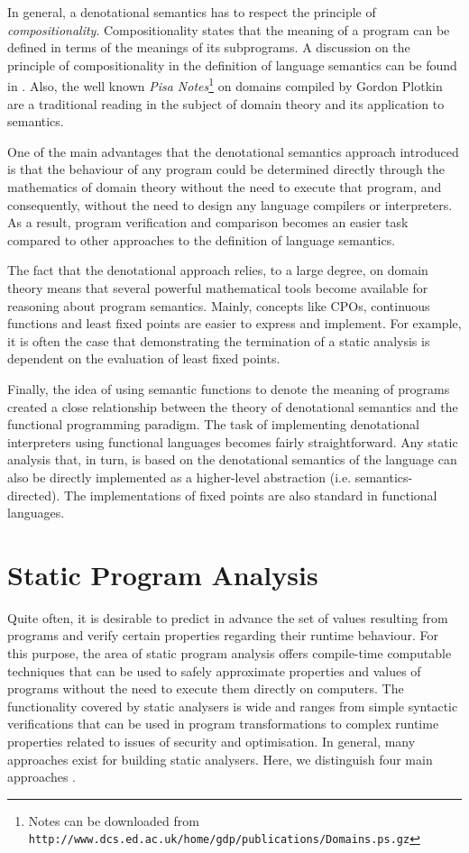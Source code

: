 \documentclass[10pt,a4paper,final,oneside,fleqn]{book}
\begin{document}
In general, a denotational semantics has to respect the principle of {\itshape compositionality\/}.  Compositionality states that the meaning of a program can be defined in terms of the meanings of its subprograms.  A discussion on the principle of compositionality in the definition of language semantics can be found in \cite{tennent1}.  Also, the well known {\itshape Pisa Notes\/}\footnote{Notes can be downloaded from \texttt{http://www.dcs.ed.ac.uk/home/gdp/publications/Domains.ps.gz}} on domains compiled by Gordon Plotkin are a traditional reading in the subject of domain theory and its application to semantics.

One of the main advantages that the denotational semantics approach introduced is that the behaviour of any program could be determined directly through the mathematics of domain theory without the need to execute that program, and consequently, without the need to design any language compilers or interpreters.  As a result, program verification and comparison becomes an easier task compared to other approaches to the definition of language semantics.

The fact that the denotational approach relies, to a large degree, on domain theory means that several powerful mathematical tools become available for reasoning about program semantics.  Mainly, concepts like CPOs, continuous functions and least fixed points are easier to express and implement.  For example, it is often the case that demonstrating the termination of a static analysis is dependent on the evaluation of least fixed points.

Finally, the idea of using semantic functions to denote the meaning of programs created a close relationship between the theory of denotational semantics and the functional programming paradigm.  The task of implementing denotational interpreters using functional languages becomes fairly straightforward.  Any static analysis that, in turn, is based on the denotational semantics of the language can also be directly implemented as a higher-level abstraction (i.e. semantics-directed).  The implementations of fixed points are also standard in functional languages.
\section{Static Program Analysis}
Quite often, it is desirable to predict in advance the set of values resulting from programs and verify certain properties regarding their runtime behaviour.  For this purpose, the area of static program analysis offers compile-time computable techniques that can be used to safely approximate properties and values of programs without the need to execute them directly on computers.  The functionality covered by static analysers is wide and ranges from simple syntactic verifications that can be used in program transformations to complex runtime properties related to issues of security and optimisation.  In general, many approaches exist for building static analysers.  Here, we distinguish four main approaches \cite{nielson1}.
\end{document}
